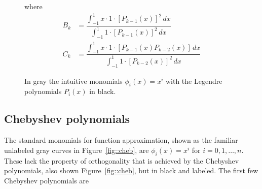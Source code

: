 \documentclass[11pt]{article}
\begin{document}
\begin{figure}[h!]
\begin{minipage}[c]{0.48\textwidth}
where
\begin{align*}
B_k & = \dfrac{\int_{-1}^1 x \cdot 1 \cdot [P_{k-1}(x)]^2\,dx}{\int_{-1}^1 1 \cdot [P_{k-1}(x)]^2\,dx}\\
C_k & = \dfrac{\int_{-1}^1 x \cdot 1 \cdot [P_{k-1}(x) P_{k-2}(x)]\,dx}{\int_{-1}^1 1 \cdot [P_{k-2}(x)]^2\,dx}
\end{align*}

\caption{In gray the intuitive monomials \(\phi_i(x) = x^i\) with the Legendre polynomials \(P_i(x)\) in black.}\label{fig::leg}

\end{minipage}
\end{figure}

\subsection{Chebyshev polynomials}
The standard monomials for function approximation, shown as the familiar unlabeled gray curves in Figure~\ref{fig::cheb}, are \(\phi_i(x) = x^i\) for \(i=0, 1, \dots, n\).  These lack the property of orthogonality that is achieved by the Chebyshev polynomials, also shown Figure~\ref{fig::cheb}, but in black and labeled. The first few Chebyshev polynomials are
%
\end{document}
